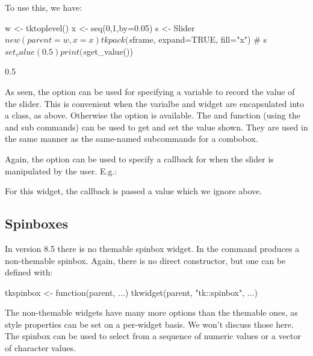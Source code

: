 To use this, we have:
\begin{Schunk}
\begin{Sinput}
 w <- tktoplevel()
 x <- seq(0,1,by=0.05)
 s <- Slider$new(parent=w, x=x)
 tkpack(s$frame, expand=TRUE, fill="x")
 #
 s$set_value(0.5)
 print(s$get_value())
\end{Sinput}
\begin{Soutput}
[1] 0.5
\end{Soutput}
\end{Schunk}

As seen, the  option can be used for
specifying a \TCL\/ variable to record the value of the slider. This
is convenient when the varialbe and widget are encapsulated into a
class, as above. Otherwise the  option is
available.  The  and  function (using
the  and  sub
commands) can be used to get and set the value shown. They are used in
the same manner as the same-named subcommands for a combobox.

Again, the  option can be used to specify a
callback for when the slider is manipulated by the user. E.g.:
\begin{Schunk}
\end{Schunk}
For this widget, the callback is passed a value which we ignore above.


\subsection{Spinboxes}
\label{sec:tcltk:spinboxes}

In \TK\/ version 8.5 there is no themable spinbox widget. In \TK\/ the
 command produces a non-themable spinbox. Again, there
is no direct  constructor, but one can be
defined with:
\begin{Schunk}
\begin{Sinput}
 tkspinbox <- function(parent, ...) 
   tkwidget(parent, "tk::spinbox", ...)
\end{Sinput}
\end{Schunk}

The non-themable widgets have many more options than the themable
ones, as style properties can be set on a per-widget basis. We won't
discuss those here. The spinbox can be used to select from a sequence
of numeric values or a vector of character values.


